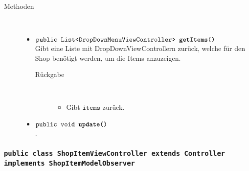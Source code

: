 \begin{description}
\item[Methoden] \hfill \\
	\vspace{-.8cm}
	\begin{itemize}
		\item $\texttt{public List<DropDownMenuViewController> \textbf{getItems}()}$ \\ Gibt eine Liste mit DropDownViewControllern zurück, welche für den Shop benötigt werden, um die Items anzuzeigen.
		\begin{description}
			\item[Rückgabe] \hfill \\
			\vspace{-.8cm}
			\begin{itemize}
				\item Gibt $\texttt{items}$ zurück.
			\end{itemize}
			\end{description}
		
		\item $\texttt{public void \textbf{update}()}$ \\.


		\end{itemize}
	\end{description}
	
	
\subsubsection{\normalfont \texttt{public class \textbf{ShopItemViewController} extends Controller implements ShopItemModelObserver}}

